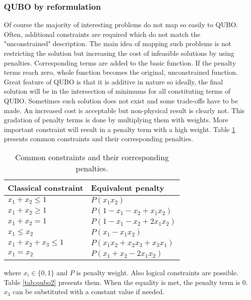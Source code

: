 \subsubsection{QUBO by reformulation}
Of course the majority of interesting problems do not map so easily to QUBO. Often, additional constraints are required which do not match the "unconstrained" description. The main idea of mapping such problems is not restricting the solution but increasing the cost of infeasible solutions by using penalties. Corresponding terms are added to the basic function. If the penalty terms reach zero, whole function becomes the original, unconstrained function. Great feature of QUBO is that it is additive in nature so ideally, the final solution will be in the intersection of minimums for all constituting terms of QUBO. Sometimes such solution does not exist and some trade-offs have to be made. An increased cost is acceptable but non-physical result is clearly not. This gradation of penalty terms is done by multiplying them with weights. More important constraint will result in a penalty term with a high weight. Table \ref{tab:qubo1} presents common constraints and their corresponding penalties.

\begin{table}[h]
\begin{center}
\begin{tabular}{ l l }
 Classical constraint & Equivalent penalty\\ 
  \hline
 $x_1 + x_2 \le 1$ & $P(x_1x_2)$ \\  
 $x_1 + x_2 \ge 1$ & $P(1- x_1 - x_2 + x_1x_2)$ \\
 $x_1 + x_2 = 1$ & $P(1- x_1 - x_2 + 2x_1x_2)$ \\
 $x_1 \le x_2$ & $P(x_1 - x_1x_2)$ \\
 $x_1 + x_2 + x_3 \le 1$ & $P(x_1x_2 + x_2x_3 + x_3x_1)$ \\
 $x_1 = x_2$ & $P(x_1 + x_2 - 2x_1x_2)$ \\
\end{tabular}
\end{center}
\caption{Common constraints and their corresponding penalties.}
\label{tab:qubo1}
\end{table}

where $x_i\in\lbrace 0,1\rbrace$ and $P$ is penalty weight. Also logical constraints are possible. Table \ref{tab:qubo2} presents them. When the equality is met, the penalty term is $0$. $x_3$ can be substituted with a constant value if needed.


